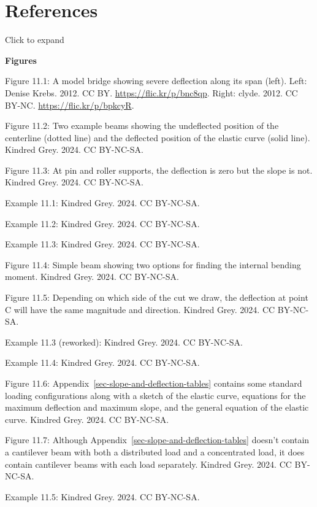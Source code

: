 \documentclass[
  letterpaper,
  DIV=11,
  numbers=noendperiod]{scrreprt}
\theoremstyle{definition}
\theoremstyle{remark}
\begin{document}
\section*{References}\label{references-10}


Click to expand

\textbf{Figures}

Figure 11.1: A model bridge showing severe deflection along its span
(left). Left: Denise Krebs. 2012. CC BY. \url{https://flic.kr/p/bnc8qp}.
Right: clyde. 2012. CC BY-NC. \url{https://flic.kr/p/bpkcyR}.

Figure 11.2: Two example beams showing the undeflected position of the
centerline (dotted line) and the deflected position of the elastic curve
(solid line). Kindred Grey. 2024. CC BY-NC-SA.

Figure 11.3: At pin and roller supports, the deflection is zero but the
slope is not. Kindred Grey. 2024. CC BY-NC-SA.

Example 11.1: Kindred Grey. 2024. CC BY-NC-SA.

Example 11.2: Kindred Grey. 2024. CC BY-NC-SA.

Example 11.3: Kindred Grey. 2024. CC BY-NC-SA.

Figure 11.4: Simple beam showing two options for finding the internal
bending moment. Kindred Grey. 2024. CC BY-NC-SA.

Figure 11.5: Depending on which side of the cut we draw, the deflection
at point C will have the same magnitude and direction. Kindred Grey.
2024. CC BY-NC-SA.

Example 11.3 (reworked): Kindred Grey. 2024. CC BY-NC-SA.

Example 11.4: Kindred Grey. 2024. CC BY-NC-SA.

Figure 11.6: Appendix~\ref{sec-slope-and-deflection-tables} contains
some standard loading configurations along with a sketch of the elastic
curve, equations for the maximum deflection and maximum slope, and the
general equation of the elastic curve. Kindred Grey. 2024. CC BY-NC-SA.

Figure 11.7: Although Appendix~\ref{sec-slope-and-deflection-tables}
doesn't contain a cantilever beam with both a distributed load and a
concentrated load, it does contain cantilever beams with each load
separately. Kindred Grey. 2024. CC BY-NC-SA.

Example 11.5: Kindred Grey. 2024. CC BY-NC-SA.
\end{document}
